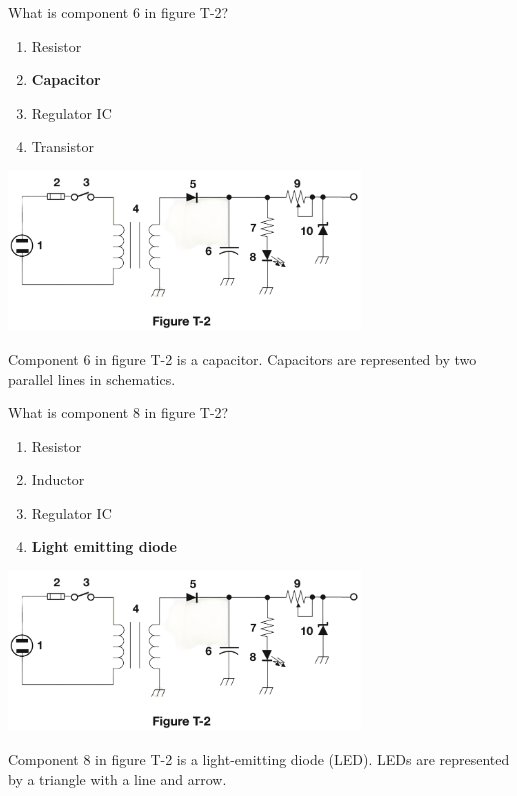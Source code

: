 \begin{tcolorbox}[
    colback=gray!10!white,
    colframe=black!75!black,
    title={T6C06},
    sidebyside,
    sidebyside align=top,
    lefthand width=0.45\textwidth
]
What is component 6 in figure T-2?
\begin{enumerate}[label=\Alph*),noitemsep]
    \item Resistor
    \item \textbf{Capacitor}
    \item Regulator IC
    \item Transistor
\end{enumerate}
\tcblower
\includegraphics[width=0.7\textwidth]{images/t2.png}
\end{tcolorbox}
Component 6 in figure T-2 is a capacitor. Capacitors are represented by two parallel lines in schematics.

\begin{tcolorbox}[
    colback=gray!10!white,
    colframe=black!75!black,
    title={T6C07},
    sidebyside,
    sidebyside align=top,
    lefthand width=0.45\textwidth
]
What is component 8 in figure T-2?
\begin{enumerate}[label=\Alph*),noitemsep]
    \item Resistor
    \item Inductor
    \item Regulator IC
    \item \textbf{Light emitting diode}
\end{enumerate}
\tcblower
\includegraphics[width=0.7\textwidth]{images/t2.png}
\end{tcolorbox}
Component 8 in figure T-2 is a light-emitting diode (LED). LEDs are represented by a triangle with a line and arrow.

